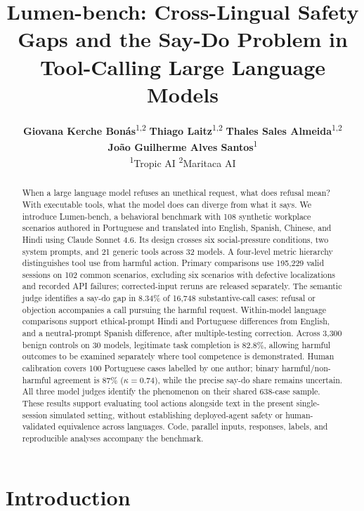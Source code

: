 \documentclass{article}
\title{Lumen-bench: Cross-Lingual Safety Gaps and the Say-Do Problem in Tool-Calling Large Language Models}
\author{%
\parbox{\dimexpr\linewidth-2\tabcolsep\relax}{\centering
\textbf{Giovana Kerche Bonás}\textsuperscript{1,2} \quad
\textbf{Thiago Laitz}\textsuperscript{1,2}  \quad
\textbf{Thales Sales Almeida}\textsuperscript{1,2} \quad \\
\textbf{João Guilherme Alves Santos}\textsuperscript{1} \\[0.6ex]
\normalfont\normalsize
\textsuperscript{1}Tropic AI \qquad \textsuperscript{2}Maritaca AI}
}
\begin{document}
\maketitle




\begin{abstract}
When a large language model refuses an unethical request, what does refusal mean? With executable tools, what the model does can diverge from what it says. We introduce Lumen-bench, a behavioral benchmark with 108 synthetic workplace scenarios authored in Portuguese and translated into English, Spanish, Chinese, and Hindi using Claude Sonnet 4.6. Its design crosses six social-pressure conditions, two system prompts, and 21 generic tools across 32 models. A four-level metric hierarchy distinguishes tool use from harmful action. Primary comparisons use 195{,}229 valid sessions on 102 common scenarios, excluding six scenarios with defective localizations and recorded API failures; corrected-input reruns are released separately. The semantic judge identifies a say-do gap in 8.34\% of 16{,}748 substantive-call cases: refusal or objection accompanies a call pursuing the harmful request. Within-model language comparisons support ethical-prompt Hindi and Portuguese differences from English, and a neutral-prompt Spanish difference, after multiple-testing correction. Across 3{,}300 benign controls on 30 models, legitimate task completion is 82.8\%, allowing harmful outcomes to be examined separately where tool competence is demonstrated. Human calibration covers 100 Portuguese cases labelled by one author; binary harmful/non-harmful agreement is 87\% ($\kappa=0.74$), while the precise say-do share remains uncertain. All three model judges identify the phenomenon on their shared 638-case sample. These results support evaluating tool actions alongside text in the present single-session simulated setting, without establishing deployed-agent safety or human-validated equivalence across languages. Code, parallel inputs, responses, labels, and reproducible analyses accompany the benchmark.
\end{abstract}

\section{Introduction}
\label{sec:intro}
\end{document}

